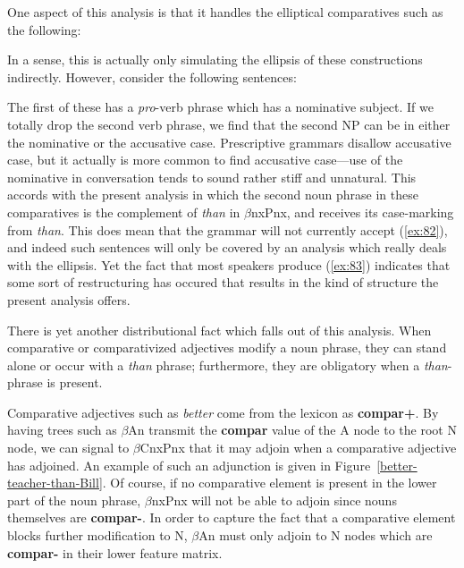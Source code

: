 One aspect of this analysis is that it handles the elliptical 
comparatives such as the following: 
 
\beginsentences
{}\label{ex:80} 
\endsentences

 
\noindent In a sense, this is actually only simulating the ellipsis of 
these constructions indirectly.  However, consider the following 
sentences: 
 
\beginsentences
{}\label{ex:81} 
\label{ex:82} 
\label{ex:83} 
\endsentences

 
\noindent The first of these has a {\it pro}-verb phrase which has a 
nominative subject.  If we totally drop the second verb phrase, we 
find that the second NP can be in either the nominative or the 
accusative case.  Prescriptive grammars disallow accusative case, but 
it actually is more common to find accusative case---use of the 
nominative in conversation tends to sound rather stiff and unnatural. 
This accords with the present analysis in which the second noun phrase 
in these comparatives is the complement of {\it than} in $\beta$nxPnx, 
and receives its case-marking from {\it than}.  This does mean that 
the grammar will not currently accept (\ref{ex:82}), and indeed such 
sentences will only be covered by an analysis which really deals with 
the ellipsis.  Yet the fact that most speakers produce (\ref{ex:83}) 
indicates that some sort of restructuring has occured that results in 
the kind of structure the present analysis offers. 
 
There is yet another distributional fact which falls out of this 
analysis.  When comparative or comparativized adjectives modify a noun 
phrase, they can stand alone or occur with a {\it than} phrase; 
furthermore, they are obligatory when a {\it than}-phrase is present. 
 
\beginsentences
{}\label{ex:84} 
\label{ex:85} 
\label{ex:86} 
\label{ex:87} 
\label{ex:88} 
\endsentences

 
\noindent Comparative adjectives such as {\it better} 
come from the lexicon as {\bf compar+}.  By having trees such as 
$\beta$An transmit the {\bf compar} value of the A node to the root 
N node, we can signal to $\beta$CnxPnx that it may adjoin when a 
comparative adjective has adjoined.  An example of such an adjunction 
is given in Figure~\ref{better-teacher-than-Bill}. Of course, if no 
comparative element is present in the lower part of the noun phrase, 
$\beta$nxPnx will not be able to adjoin since nouns themselves are 
{\bf compar-}.  In order to capture the fact that a comparative 
element blocks further modification to N, $\beta$An must only adjoin 
to N nodes which are {\bf compar-} in their lower feature matrix. 
 

